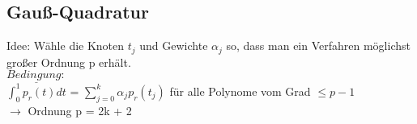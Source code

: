 \documentclass[10pt,landscape,a4paper]{article}
\begin{document}
\begin{multicols}{3}
\subsection{Gauß-Quadratur}
Idee: Wähle die Knoten $t_j$ und Gewichte $\alpha_j$ so, dass man ein Verfahren möglichst großer Ordnung p erhält. \\
$\underline{Bedingung:}$ \\
$\int_0^1 p_r(t)dt$ = $\sum\limits_{j=0}^k \alpha_j p_r (t_j)$ für alle Polynome vom Grad $\leq p-1$ \\
$\rightarrow$ Ordnung p = 2k + 2





\end{multicols}
\end{document}
